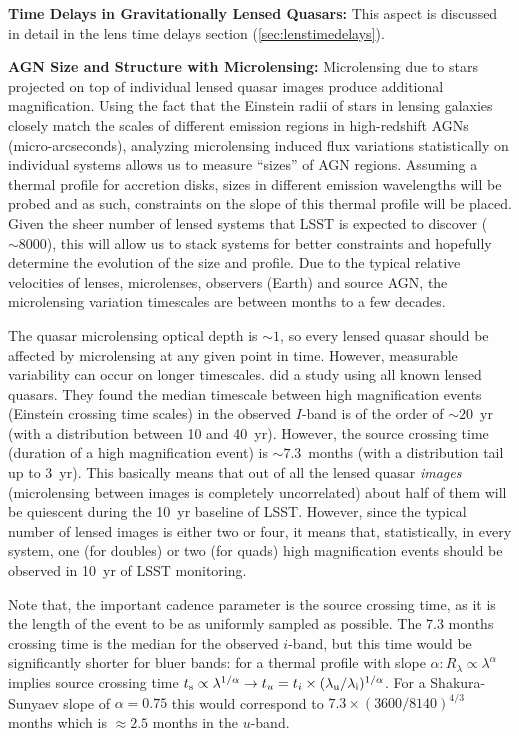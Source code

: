 {\bf Time Delays in Gravitationally Lensed Quasars:} This aspect is discussed in detail in the
lens time delays section (\autoref{sec:lenstimedelays}).

{\bf AGN Size and Structure with Microlensing:} Microlensing due to stars projected on top of individual lensed quasar images produce additional magnification. Using the fact that the Einstein radii of stars in lensing galaxies closely match the scales of different emission regions in high-redshift AGNs (micro-arcseconds), analyzing microlensing induced flux variations statistically on individual systems allows us to measure ``sizes'' of AGN regions.
%
Assuming a thermal profile for accretion disks, sizes in different emission wavelengths will be probed and as such, constraints on the slope of this thermal profile will be placed. Given the sheer number of lensed systems that LSST is expected to discover ($\sim8000$), this will allow us to stack systems for better constraints and hopefully determine the evolution of the size and profile. Due to the typical relative velocities of lenses, microlenses, observers (Earth) and source AGN, the microlensing variation timescales are between months to a few decades.

The quasar microlensing optical depth is $\sim1$, so every lensed quasar should be affected by microlensing at any given point in time. However, measurable variability can occur on longer timescales. \citet{MosqueraandKochanek2011} did a study using all known lensed quasars. They found the median timescale between high magnification events (Einstein crossing time scales) in the observed $I$-band is of the order of $\sim20$~yr (with a distribution between 10 and 40~yr). However, the source crossing time (duration of a high magnification event) is $\sim7.3$~months (with a distribution tail up to 3~yr). This basically means that out of all the lensed quasar {\em images} (microlensing between images is completely uncorrelated) about half of them will be quiescent during the 10~yr baseline of LSST. However, since the typical number of lensed images is either two or four, it means that, statistically, in every system, one (for doubles) or two (for quads) high magnification events should be observed in 10~yr of LSST monitoring.

Note that, the important cadence parameter is the source crossing time, as it is the length of the event to be as uniformly sampled as possible. The 7.3 months crossing time is the median for the observed $i$-band, but this time would be significantly shorter for bluer bands: for a thermal profile with slope $\alpha: R_\lambda \propto \lambda^\alpha$ implies source crossing time $t_{\rm s} \propto \lambda^{1/\alpha} \rightarrow t_u=t_i \times (\lambda_{\rm u} / \lambda_{\rm i})^{1/\alpha}$. For a Shakura-Sunyaev slope of $\alpha=0.75$ this would correspond to $7.3 \times (3600/8140)^{4/3}$ months which is $\approx 2.5$ months in the $u$-band.

